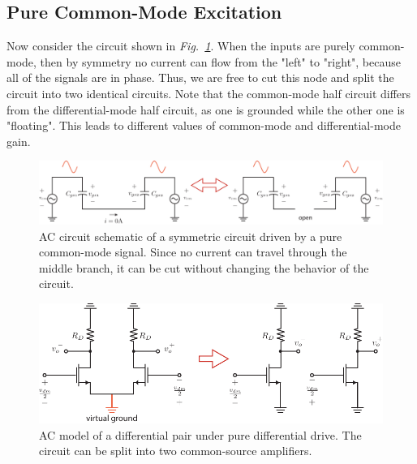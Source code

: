 \subsection{Pure Common-Mode Excitation}
Now consider the circuit shown in \emph{Fig.~\ref{fig:CM_model}}.  When the inputs are purely common-mode, then by symmetry no current can flow from the "left" to "right", because all of the signals are in phase.  Thus, we are free to cut this node and split the circuit into two identical circuits.  Note that the common-mode half circuit differs from the differential-mode half circuit, as one is grounded while the other one is "floating".  This leads to different values of common-mode and differential-mode gain.
\begin{figure}[H]
\centering
\includegraphics[width=\columnwidth]{CM_model}
\caption{AC circuit schematic of a symmetric circuit driven by a pure common-mode signal.  Since no current can travel through the middle branch, it can be cut without changing the behavior of the circuit.}
\label{fig:CM_model}
\end{figure}
\newpage
\begin{figure}[t]
\centering
\includegraphics[scale=1.05]{Diff_Pair_DM_Drive}
\caption{AC model of a differential pair under pure differential drive.   The circuit can be split into two common-source amplifiers.}
\label{fig:Diff_Pair_DM_Drive}
\end{figure}
